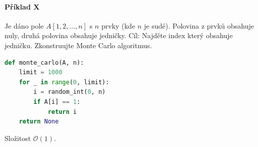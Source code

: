 \paragraph*{Příklad X} Je dáno pole $A[1, 2, \dots, n]$ s $n$ prvky (kde $n$ je sudé). Polovina z prvků obsahuje nuly, druhá polovina obsahuje jedničky. Cíl: Najděte index který obsahuje jedničku. Zkonstruujte Monte Carlo algoritmus.

\bigskip\noindent\begin{minipage}{\linewidth}
\begin{lstlisting}[language=Python, caption={Monte Carlo}]
def monte_carlo(A, n):
    limit = 1000
    for _ in range(0, limit):
        i = random_int(0, n)
        if A[i] == 1:
            return i
    return None
\end{lstlisting}
\end{minipage}

\begin{compactitem}
    \item Složitost $\mathcal{O}(1)$.
\end{compactitem}
